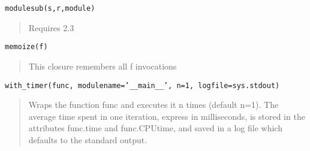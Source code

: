 \documentclass[10pt,english]{article}
\begin{document}
\texttt{modulesub(s,r,module)}
\begin{quote}

Requires 2.3
\end{quote}

\texttt{memoize(f)}
\begin{quote}

This closure remembers all f invocations
\end{quote}

\texttt{with{\_}timer(func, modulename='{\_}{\_}main{\_}{\_}', n=1, logfile=sys.stdout)}
\begin{quote}

Wraps the function func and executes it n times (default n=1). 
The average time spent in one iteration, express in milliseconds, 
is stored in the attributes func.time and func.CPUtime, and saved 
in a log file which defaults to the standard output.
\end{quote}
\end{document}
